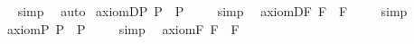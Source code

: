 \begin{isabellebody}
\ %
\endisadelimproof
%
\isatagproof
{}\isamarkupfalse%
\ simp\ \isamarkupfalse%
\ auto%
\endisatagproof
{\isafoldproof}%
%
\isadelimproof
%
\endisadelimproof
\isanewline
\isanewline
{}\isamarkupfalse%
\ axiom{\isacharunderscore}D{\isacharunderscore}P{\isacharcolon}\ {\isachardoublequoteopen}{\isacharbrackleft}\isactrlbold {\isasymbox}{\isacharparenleft}{\isasymphi}\isactrlsup P{\isacharparenright}\ \isactrlbold {\isasymrightarrow}\ \isactrlbold {\isasymbox}{\isacharparenleft}\isactrlbold {\isasymbox}{\isacharparenleft}{\isasymphi}\isactrlsup P{\isacharparenright}{\isacharparenright}{\isacharbrackright}\ {\isacharequal}\ {\isasymtop}{\isachardoublequoteclose}%
\isadelimproof
\ %
\endisadelimproof
%
\isatagproof
{}\isamarkupfalse%
\ simp\ \isamarkupfalse%
%
\endisatagproof
{\isafoldproof}%
%
\isadelimproof
%
\endisadelimproof
\isanewline
{}\isamarkupfalse%
\ axiom{\isacharunderscore}D{\isacharunderscore}F{\isacharcolon}\ {\isachardoublequoteopen}{\isacharbrackleft}\isactrlbold {\isasymbox}{\isacharparenleft}{\isasymphi}\isactrlsup F{\isacharparenright}\ \isactrlbold {\isasymrightarrow}\ \isactrlbold {\isasymbox}{\isacharparenleft}\isactrlbold {\isasymbox}{\isacharparenleft}{\isasymphi}\isactrlsup F{\isacharparenright}{\isacharparenright}{\isacharbrackright}\ {\isacharequal}\ {\isasymtop}{\isachardoublequoteclose}%
\isadelimproof
\ %
\endisadelimproof
%
\isatagproof
{}\isamarkupfalse%
\ simp\ \isamarkupfalse%
%
\endisatagproof
{\isafoldproof}%
%
\isadelimproof
%
\endisadelimproof
\isanewline
\isanewline
{}\isamarkupfalse%
\ axiom{\isacharunderscore}{}{\isacharunderscore}P{\isacharcolon}\ {\isachardoublequoteopen}{\isacharbrackleft}\isactrlbold {\isasymdiamond}{\isacharparenleft}{\isasymphi}\isactrlsup P{\isacharparenright}\ \isactrlbold {\isasymrightarrow}\ \isactrlbold {\isasymbox}{\isacharparenleft}\isactrlbold {\isasymdiamond}{\isacharparenleft}{\isasymphi}\isactrlsup P{\isacharparenright}{\isacharparenright}{\isacharbrackright}\ {\isacharequal}\ {\isasymtop}{\isachardoublequoteclose}%
\isadelimproof
\ %
\endisadelimproof
%
\isatagproof
{}\isamarkupfalse%
\ simp\ \isamarkupfalse%
%
\endisatagproof
{\isafoldproof}%
%
\isadelimproof
%
\endisadelimproof
\isanewline
{}\isamarkupfalse%
\ axiom{\isacharunderscore}{}{\isacharunderscore}F{\isacharcolon}\ {\isachardoublequoteopen}{\isacharbrackleft}\isactrlbold {\isasymdiamond}{\isacharparenleft}{\isasymphi}\isactrlsup F{\isacharparenright}\ \isactrlbold {\isasymrightarrow}\ \isactrlbold {\isasymbox}{\isacharparenleft}\isactrlbold {\isasymdiamond}{\isacharparenleft}{\isasymphi}\isactrlsup F{\isacharparenright}{\isacharparenright}{\isacharbrackright}\ {\isacharequal}\ {\isasymtop}{\isachardoublequoteclose}%

\end{isabellebody}
